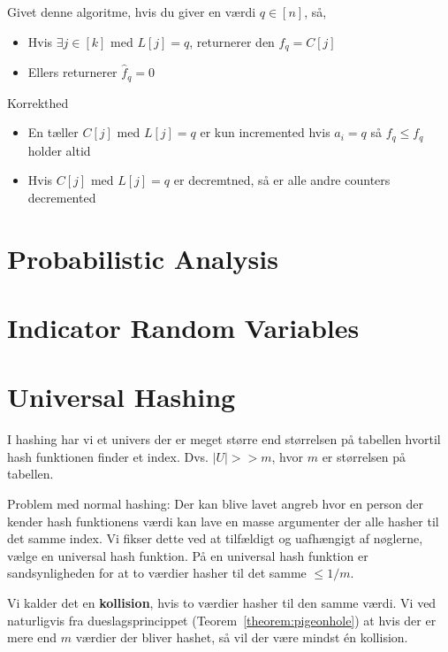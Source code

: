 \documentclass[11pt]{article}
\theoremstyle{definition}
\theoremstyle{remark}
\begin{document}
Givet denne algoritme, hvis du giver en værdi $q \in [n]$, så,
\begin{itemize}
\item Hvis $\exists j \in [k]$ med $L[j]=q$, returnerer den $\hat{f}_q = C[j]$
\item Ellers returnerer $\hat{f}_{q} = 0$
\end{itemize}

\noindent
\large Korrekthed\\
\noindent
\begin{itemize}
\item En tæller $C[j]$ med $L[j] = q$ er kun incremented hvis $a_{i} = q$ så $f_{q} \leq f_{q}$ holder altid
\item Hvis $C[j]$ med $L[j] = q$ er decremtned, så er alle andre counters decremented
\end{itemize}


\newpage

\section{Probabilistic Analysis}
\label{sec:proban}

\section{Indicator Random Variables}
\label{sec:indicator}

\section{Universal Hashing}
\label{sec:hashing}


I hashing har vi et univers der er meget større end størrelsen på tabellen hvortil hash funktionen finder et index. Dvs. $|U| >> m$, hvor $m$ er størrelsen på tabellen.

Problem med normal hashing: Der kan blive lavet angreb hvor en person der kender hash funktionens værdi kan lave en masse argumenter der alle hasher til det samme index. Vi fikser dette ved at tilfældigt og uafhængigt af nøglerne, vælge en universal hash funktion. På en universal hash funktion er sandsynligheden for at to værdier hasher til det samme $\leq 1/m$.

Vi kalder det en \textbf{kollision}, hvis to værdier hasher til den samme værdi. Vi ved naturligvis fra dueslagsprincippet (Teorem~\ref{theorem:pigeonhole}) at hvis der er mere end $m$ værdier der bliver hashet, så vil der være mindst én kollision. 
\end{document}
